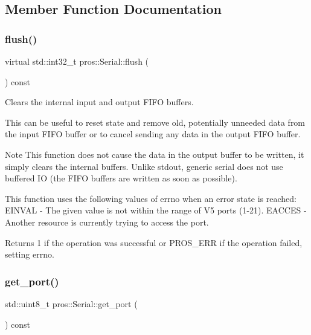\subsection{Member Function Documentation}
\mbox{\label{classpros_1_1Serial_a4d897c6f3f83636f4d4627ab02c10e76}} 
\subsubsection{\texorpdfstring{flush()}{flush()}}
{\footnotesize\ttfamily virtual std\+::int32\+\_\+t pros\+::\+Serial\+::flush (\begin{DoxyParamCaption}{ }\end{DoxyParamCaption}) const\hspace{0.3cm}{\ttfamily [virtual]}}



Clears the internal input and output F\+I\+FO buffers. 

This can be useful to reset state and remove old, potentially unneeded data from the input F\+I\+FO buffer or to cancel sending any data in the output F\+I\+FO buffer.

\begin{DoxyNote}{Note}
This function does not cause the data in the output buffer to be written, it simply clears the internal buffers. Unlike stdout, generic serial does not use buffered IO (the F\+I\+FO buffers are written as soon as possible).
\end{DoxyNote}
This function uses the following values of errno when an error state is reached\+: E\+I\+N\+V\+AL -\/ The given value is not within the range of V5 ports (1-\/21). E\+A\+C\+C\+ES -\/ Another resource is currently trying to access the port.

\begin{DoxyReturn}{Returns}
1 if the operation was successful or P\+R\+O\+S\+\_\+\+E\+RR if the operation failed, setting errno. 
\end{DoxyReturn}
\mbox{\label{classpros_1_1Serial_a74560cbf9ec7bc3f49cbf54aadb049a9}} 
\subsubsection{\texorpdfstring{get\+\_\+port()}{get\_port()}}
{\footnotesize\ttfamily std\+::uint8\+\_\+t pros\+::\+Serial\+::get\+\_\+port (\begin{DoxyParamCaption}{ }\end{DoxyParamCaption}) const}




